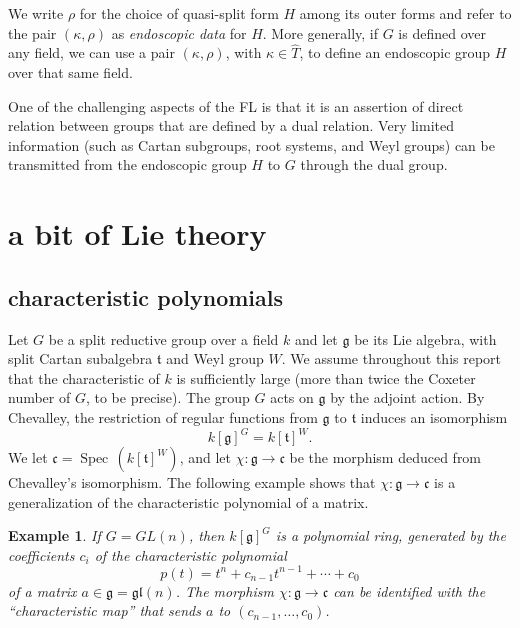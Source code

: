 \documentclass[brochure,english,12pt]{bourbaki}
\theoremstyle{plain}
\newtheorem{example}[equation]{Example}
\def\op#1{{\operatorname{#1}}}
\def\gl{\mathfrak{gl}}
\def\g{\mathfrak{g}}
\def\t{\mathfrak{t}}
\def\cc{\mathfrak{c}}
\begin{document}
We write $\rho$ for the choice of quasi-split form $H$ among its outer
forms and refer to the pair $(\kappa,\rho)$ as {\it endoscopic data}
for $H$.  More generally, if $G$ is defined over any field, we can use
a pair $(\kappa,\rho)$, with $\kappa\in \hat T$, to define
an endoscopic group $H$ over that same field.

One of the challenging aspects of the FL is that it is an assertion of
direct relation between groups that are defined by a dual
relation.  Very limited information (such as
Cartan subgroups, root systems, and Weyl groups) can be transmitted
from the endoscopic group $H$ to $G$ through the dual group.





\section{a bit of Lie theory}



\subsection{characteristic polynomials}\label{sec:chevalley}



Let $G$ be a split reductive group over a field $k$ and let
$\g$ be its Lie algebra, with split Cartan subalgebra $\t$ and Weyl
group $W$.  We assume throughout this report that the characteristic of $k$ is sufficiently
large (more than twice the Coxeter number of $G$, to be precise).  The group
$G$ acts on $\g$ by the adjoint action.  By Chevalley,  the restriction  of regular
functions from $\g$ to $\t$ induces an isomorphism
\[
k[\g]^G = k[\t]^W.
\]
We let $\cc =  \op{Spec}\,(k[\t]^W)$, and let $\chi:\g\to\cc$ be the morphism deduced from
Chevalley's isomorphism.  The following example shows that $\chi:\g\to\cc$ is a generalization
of the characteristic polynomial of a matrix.

\begin{example}
If $G=GL(n)$, then $k[\g]^G$ is a polynomial ring,  generated by the coefficients $c_i$ of the characteristic
polynomial 
\begin{equation}
p(t)=t^n + c_{n-1} t^{n-1} +\cdots +c_0
\end{equation}
of a matrix $a\in \g=\gl(n)$.  The morphism $\chi:\g\to\cc$ can be identified with
the ``characteristic map'' that sends $a$ to $(c_{n-1},\ldots,c_0)$.
\end{example}
\end{document}
